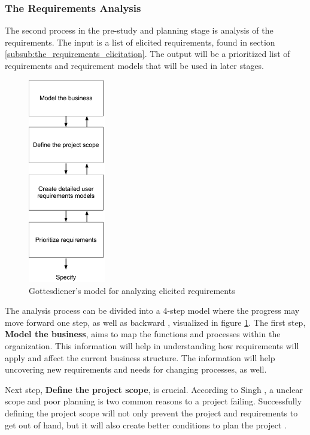 \documentclass[a4paper]{article}
\begin{document}
\subsubsection{The Requirements Analysis}
\label{subsub:the_requirements_analysis}
The second process in the pre-study and planning stage is analysis of the requirements. The input is a list of elicited requirements, found in section \ref{subsub:the_requirements_elicitation}. The output will be a prioritized list of requirements and requirement models that will be used in later stages.

\begin{figure}[H]
	\centering
		\includegraphics[width=0.3\textwidth]{images/analysis_model.png}
	\caption{Gottesdiener's model for analyzing elicited requirements \cite{gott4}}
	\label{figure:analysis}
\end{figure}

The analysis process can be divided into a 4-step model where the progress may move forward one step, as well as backward \cite{gott4}, visualized in figure \ref{figure:analysis}. The first step, \textbf{Model the business}, aims to map the functions and processes within the organization. This information will help in understanding how requirements will apply and affect the current business structure. The information will help uncovering new requirements and needs for changing processes, as well.
 
Next step, \textbf{Define the project scope}, is crucial. According to Singh \cite{projectsmart}, a unclear scope and poor planning is two common reasons to a project failing. Successfully defining the project scope will not only prevent the project and requirements to get out of hand, but it will also create better conditions to plan the project \cite{gott4}. 
\end{document}
